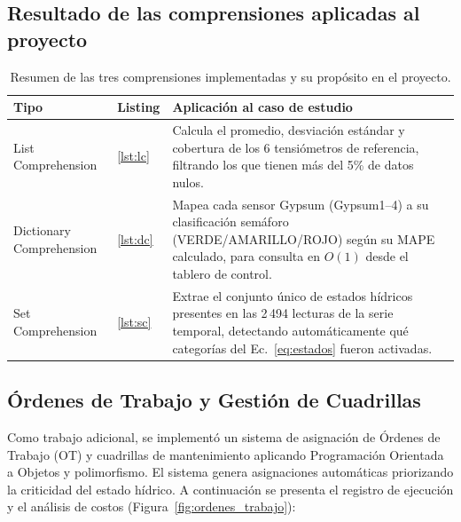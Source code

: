 \documentclass[12pt,a4paper]{article}
\begin{document}
\subsection{Resultado de las comprensiones aplicadas al proyecto}

\begin{table}[H]
\centering
\small
\caption{Resumen de las tres comprensiones implementadas y su propósito en el proyecto.}
\label{tab:comprensiones}
\begin{tabularx}{\textwidth}{@{}llX@{}}
\toprule
\textbf{Tipo} & \textbf{Listing} & \textbf{Aplicación al caso de estudio} \\
\midrule
List Comprehension & \ref{lst:lc} & Calcula el promedio, desviación estándar y cobertura de los 6 tensiómetros de referencia, filtrando los que tienen más del 5\% de datos nulos. \\[4pt]
Dictionary Comprehension & \ref{lst:dc} & Mapea cada sensor Gypsum (Gypsum1--4) a su clasificación semáforo (VERDE/AMARILLO/ROJO) según su MAPE calculado, para consulta en $O(1)$ desde el tablero de control. \\[4pt]
Set Comprehension & \ref{lst:sc} & Extrae el conjunto único de estados hídricos presentes en las 2\,494 lecturas de la serie temporal, detectando automáticamente qué categorías del Ec.~\eqref{eq:estados} fueron activadas. \\
\bottomrule
\end{tabularx}
\end{table}

\subsection{Órdenes de Trabajo y Gestión de Cuadrillas}

Como trabajo adicional, se implementó un sistema de asignación de Órdenes de Trabajo (OT) y cuadrillas de mantenimiento aplicando Programación Orientada a Objetos y polimorfismo. El sistema genera asignaciones automáticas priorizando la criticidad del estado hídrico. A continuación se presenta el registro de ejecución y el análisis de costos (Figura~\ref{fig:ordenes_trabajo}):
\end{document}

